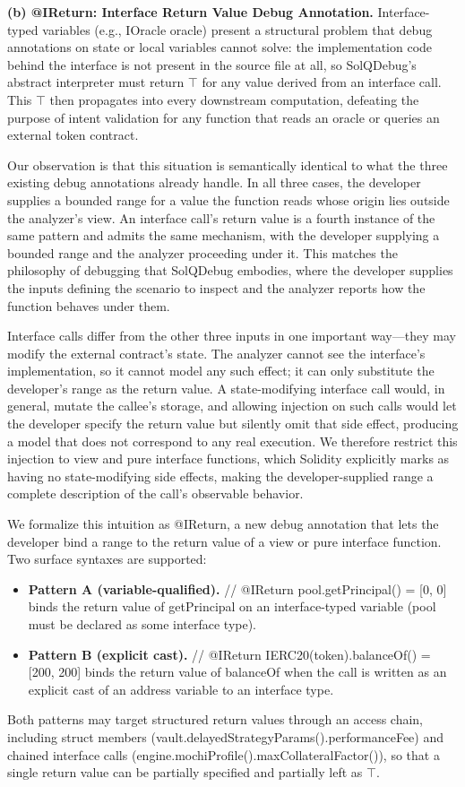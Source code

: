 \documentclass[pdflatex,sn-basic]{sn-jnl}%
\theoremstyle{thmstyleone}%
\theoremstyle{thmstyletwo}%
\theoremstyle{thmstylethree}%
\begin{document}
\smallskip
\noindent\textbf{(b) @IReturn: Interface Return Value Debug Annotation.}
Interface-typed variables (e.g., IOracle oracle) present a structural problem that debug annotations on state or local variables cannot solve: the implementation code behind the interface is not present in the source file at all, so SolQDebug's abstract interpreter must return $\top$ for any value derived from an interface call.
This $\top$ then propagates into every downstream computation, defeating the purpose of intent validation for any function that reads an oracle or queries an external token contract.

Our observation is that this situation is semantically identical to what the three existing debug annotations already handle.
In all three cases, the developer supplies a bounded range for a value the function reads whose origin lies outside the analyzer's view.
An interface call's return value is a fourth instance of the same pattern and admits the same mechanism, with the developer supplying a bounded range and the analyzer proceeding under it.
This matches the philosophy of debugging that SolQDebug embodies, where the developer supplies the inputs defining the scenario to inspect and the analyzer reports how the function behaves under them.

Interface calls differ from the other three inputs in one important way---they may modify the external contract's state.
The analyzer cannot see the interface's implementation, so it cannot model any such effect; it can only substitute the developer's range as the return value.
A state-modifying interface call would, in general, mutate the callee's storage, and allowing injection on such calls would let the developer specify the return value but silently omit that side effect, producing a model that does not correspond to any real execution.
We therefore restrict this injection to view and pure interface functions, which Solidity explicitly marks as having no state-modifying side effects, making the developer-supplied range a complete description of the call's observable behavior.

We formalize this intuition as @IReturn, a new debug annotation that lets the developer bind a range to the return value of a view or pure interface function.
Two surface syntaxes are supported:
\begin{itemize}
    \item \textbf{Pattern A (variable-qualified).}
    // @IReturn pool.getPrincipal() = [0, 0] binds the return value of getPrincipal on an interface-typed variable (pool must be declared as some interface type).
    \item \textbf{Pattern B (explicit cast).}
    // @IReturn IERC20(token).balanceOf() = [200, 200] binds the return value of balanceOf when the call is written as an explicit cast of an address variable to an interface type.
\end{itemize}
Both patterns may target structured return values through an access chain, including struct members (vault.delayedStrategyParams().performanceFee) and chained interface calls (engine.mochiProfile().maxCollateralFactor()), so that a single return value can be partially specified and partially left as $\top$.
\end{document}
